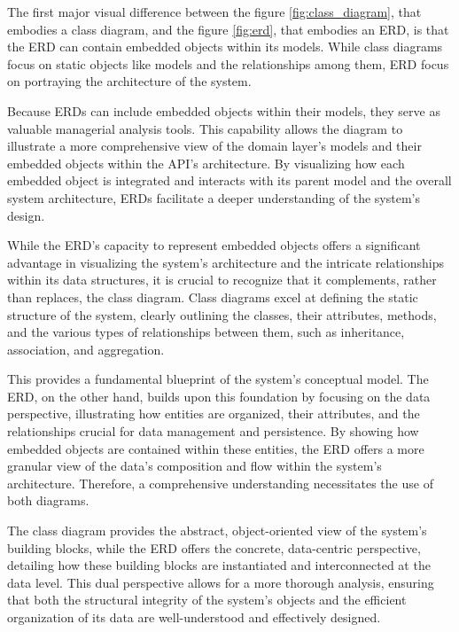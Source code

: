 The first major visual difference between the figure \ref{fig:class_diagram}, that embodies a class diagram, and the figure \ref{fig:erd}, that embodies an ERD, is that the ERD can contain embedded objects within its models. While class diagrams focus on static objects like models and the relationships among them, ERD focus on portraying the architecture of the system. 

Because ERDs can include embedded objects within their models, they serve as valuable managerial analysis tools. This capability allows the diagram to illustrate a more comprehensive view of the domain layer's models and their embedded objects within the API's architecture. By visualizing how each embedded object is integrated and interacts with its parent model and the overall system architecture, ERDs facilitate a deeper understanding of the system's design.

While the ERD's capacity to represent embedded objects offers a significant advantage in visualizing the system's architecture and the intricate relationships within its data structures, it is crucial to recognize that it complements, rather than replaces, the class diagram. Class diagrams excel at defining the static structure of the system, clearly outlining the classes, their attributes, methods, and the various types of relationships between them, such as inheritance, association, and aggregation. 

This provides a fundamental blueprint of the system's conceptual model. The ERD, on the other hand, builds upon this foundation by focusing on the data perspective, illustrating how entities are organized, their attributes, and the relationships crucial for data management and persistence. By showing how embedded objects are contained within these entities, the ERD offers a more granular view of the data's composition and flow within the system's architecture. Therefore, a comprehensive understanding necessitates the use of both diagrams. 

The class diagram provides the abstract, object-oriented view of the system's building blocks, while the ERD offers the concrete, data-centric perspective, detailing how these building blocks are instantiated and interconnected at the data level. This dual perspective allows for a more thorough analysis, ensuring that both the structural integrity of the system's objects and the efficient organization of its data are well-understood and effectively designed.


